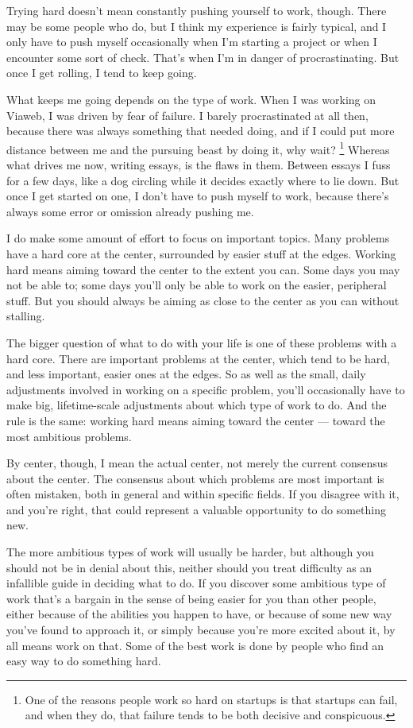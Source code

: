 Trying hard doesn't mean constantly pushing yourself to work, though.
There may be some people who do, but I think my experience is fairly
typical, and I only have to push myself occasionally when I'm starting a
project or when I encounter some sort of check. That's when I'm in
danger of procrastinating. But once I get rolling, I tend to keep going.

What keeps me going depends on the type of work. When I was working on
Viaweb, I was driven by fear of failure. I barely procrastinated at all
then, because there was always something that needed doing, and if I
could put more distance between me and the pursuing beast by doing it,
why wait? \footnote{One of the reasons people work so hard on startups is that
startups can fail, and when they do, that failure tends to be both
decisive and conspicuous.} Whereas what drives me now, writing
essays, is the flaws in them. Between essays I fuss for a few days, like
a dog circling while it decides exactly where to lie down. But once I
get started on one, I don't have to push myself to work, because there's
always some error or omission already pushing me.

I do make some amount of effort to focus on important topics. Many
problems have a hard core at the center, surrounded by easier stuff at
the edges. Working hard means aiming toward the center to the extent you
can. Some days you may not be able to; some days you'll only be able to
work on the easier, peripheral stuff. But you should always be aiming as
close to the center as you can without stalling.

The bigger question of what to do with your life is one of these
problems with a hard core. There are important problems at the center,
which tend to be hard, and less important, easier ones at the edges. So
as well as the small, daily adjustments involved in working on a
specific problem, you'll occasionally have to make big, lifetime-scale
adjustments about which type of work to do. And the rule is the same:
working hard means aiming toward the center --- toward the most
ambitious problems.

By center, though, I mean the actual center, not merely the current
consensus about the center. The consensus about which problems are most
important is often mistaken, both in general and within specific fields.
If you disagree with it, and you're right, that could represent a
valuable opportunity to do something new.

The more ambitious types of work will usually be harder, but although
you should not be in denial about this, neither should you treat
difficulty as an infallible guide in deciding what to do. If you
discover some ambitious type of work that's a bargain in the sense of
being easier for you than other people, either because of the abilities
you happen to have, or because of some new way you've found to approach
it, or simply because you're more excited about it, by all means work on
that. Some of the best work is done by people who find an easy way to do
something hard.

